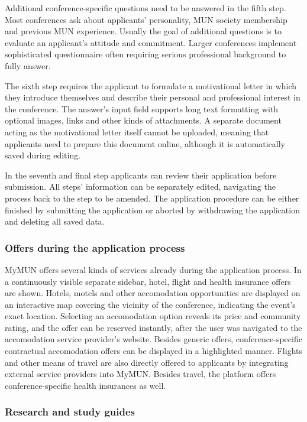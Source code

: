 Additional conference-specific questions need to be answered in the fifth step. Most conferences ask about applicants' personality, MUN society membership and previous MUN experience. Usually the goal of additional questions is to evaluate an applicant's attitude and commitment. Larger conferences implement sophisticated questionnaire often requiring serious professional background to fully answer.

The sixth step requires the applicant to formulate a motivational letter in which they introduce themselves and describe their personal and professional interest in the conference. The answer's input field supports long text formatting with optional images, links and other kinds of attachments. A separate document acting as the motivational letter itself cannot be uploaded, meaning that applicants need to prepare this document online, although it is automatically saved during editing.

In the seventh and final step applicants can review their application before submission. All steps' information can be separately edited, navigating the process back to the step to be amended. The application procedure can be either finished by submitting the application or aborted by withdrawing the application and deleting all saved data.

\subsubsection{Offers during the application process}

MyMUN offers several kinds of services already during the application process. In a continuously visible separate sidebar, hotel, flight and health insurance offers are shown. Hotels, motels and other accomodation opportunities are displayed on an interactive map covering the vicinity of the conference, indicating the event's exact location. Selecting an accomodation option reveals its price and community rating, and the offer can be reserved instantly, after the user was navigated to the accomodation service provider's website. Besides generic offers, conference-specific contractual accomodation offers can be displayed in a highlighted manner. Flights and other means of travel are also directly offered to applicants by integrating external service providers into MyMUN. Besides travel, the platform offers conference-specific health insurances as well.

\subsubsection{Research and study guides}


